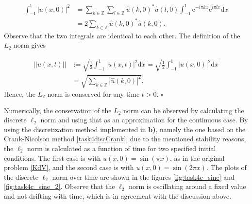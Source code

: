 \begin{equation*}
    \begin{split}
        \int_{-1}^{1} |u(x,0)|^2  &= \sum_{k \in \mathbb{Z}}\sum_{l \in \mathbb{Z}} \widehat{u}(k,0)^*\widehat{u}(l,0) \int_{-1}^{1} \mathrm{e}^{-i\pi kx} \mathrm{e}^{i\pi lx} \mathrm{d}x \\ &= 2\sum_{k \in \mathbb{Z}} \widehat{u}(k,0)^* \widehat{u}(k,0).
    \end{split}
\end{equation*}
Observe that the two integrals are identical to each other. The definition of the $L_2$ norm gives 

\begin{equation*}
\begin{split}
    ||u(x,t)|| &:= \sqrt{\frac{1}{2}\int_{-1}^{1} |u(x,t)|^2\mathrm{d}x} = \sqrt{\frac{1}{2}\int_{-1}^{1} |u(x,0)|^2\mathrm{d}x} \\ &= \sqrt{\sum_{k \in \mathbb{Z}} |\widehat{u}(k,0)|^2}.
\end{split}
\end{equation*}
Hence, the $L_2$ norm is conserved for any time $t > 0$. $\square$

Numerically, the conservation of the $L_2$ norm can be observed by calculating the discrete $\ell_2$ norm and using that as an approximation for the continuous case. By using the discretization method implemented in \textbf{b)}, namely the one based on the Crank-Nicolson method \eqref{task4discCrank}, due to the mentioned stability reasons, the $\ell_2$ norm is calculated as a function of time for two specified initial conditions. The first case is with $u(x,0)=\sin{(\pi x)}$, as in the original problem \eqref{KdV}, and the second case is with $u(x,0)=\sin{(2 \pi x)}$. The plots of the discrete $\ell_2$ norm over time are shown in the figures \ref{fig:task4c_sine} and \ref{fig:task4c_sine_2}. Observe that the $\ell_2$ norm is oscillating around a fixed value and not drifting with time, which is in agreement with the discussion above.

